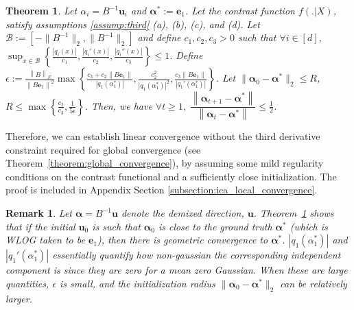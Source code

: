 \documentclass[letterpaper]{article}
\newtheorem{remark}{Remark}
\newtheorem{theorem}{Theorem}
\newcommand{\bu}{\pmb{u}}
\newcommand{\balpha}{\pmb{\alpha}}
\newcommand{\be}{\pmb{e}}
\newcommand{\norm}[1]{\left\|#1\right\|}
\newcommand{\bb}[1]{\left(#1\right)}
\begin{document}
\begin{theorem}
    \label{theorem:local_convergence}
    Let $\alpha_i=B^{-1}\bu_i$ and $\balpha^*:=\be_1$. Let the contrast function $f(.|X)$, satisfy assumptions \ref{assump:third} (a), (b), (c), and (d). Let $\mathcal{B} := [-\|B^{-1}\|_{2},\|B^{-1}\|_{2}]$ and define $c_{1}, c_{2}, c_{3} > 0$ such that $\forall i \in [d]$, $\sup_{x \in \mathcal{B}}\left\{\frac{|q_{i}\bb{x}|}{c_{1}}, \frac{|q_{i}'\bb{x}|}{c_{2}}, \frac{|q_{i}''\bb{x}|}{c_{3}}\right\} \leq 1$.
    Define $\epsilon := \frac{\norm{B}_{F}}{\norm{B\mathbf{e}_{1}}^{2}}\max\left\{\frac{c_{3}+c_{2}\norm{B\mathbf{e}_{1}}}{\left|q_{1}\bb{\alpha^{*}_{1}}\right|}, \frac{c_{2}^{2}}{\left|q_{1}\bb{\alpha^{*}_{1}}\right|^{2}}, \frac{c_{3}\norm{B\mathbf{e}_{1}}}{\left|q_{1}'\bb{\alpha^{*}_{1}}\right|}\right\}$.
    Let $\|\balpha_{0}-\balpha^{*}\|_{2} \leq R \label{assumption:2}$, $R \leq \max\left\{\frac{c_{2}}{c_{3}}, \frac{1}{5\epsilon}\right\}$. Then, we have $\forall t \geq 1, \; \dfrac{\left\|\balpha_{t+1}-\balpha^{*}\right\|}{\left\|\balpha_{t}-\balpha^{*}\right\|} \leq \frac{1}{2}$.
\end{theorem}
Therefore, we can establish linear convergence without the third derivative constraint required for global convergence (see Theorem~\ref{theorem:global_convergence}), by assuming some mild regularity conditions on the contrast functional and a sufficiently close initialization. The proof is included in Appendix Section \ref{subsection:ica_local_convergence}.
\begin{remark}
   Let $\balpha=B^{-1}\bu$ denote the demixed direction, $\bu$.  Theorem~\ref{theorem:local_convergence} shows that if the initial $\bu_0$ is such that $\balpha_0$ is close to the ground truth $\balpha^*$ (which is WLOG taken to be $\be_1$), then there is geometric convergence to $\balpha^*$. $\left|q_1(\alpha_1^*)\right|$ and $\left|q_1'(\alpha_1^*)\right|$ essentially quantify how non-gaussian the corresponding independent component is since they are zero for a mean zero Gaussian. When these are large quantities, $\epsilon$ is small, and the initialization radius $\|\balpha_0-\balpha^*\|_2$ can be relatively larger. 
\end{remark}
\end{document}
